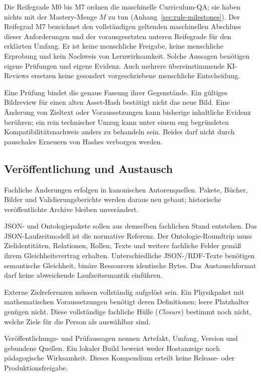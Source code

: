 Die Reifegrade M0 bis M7 ordnen die maschinelle Curriculum-QA; sie haben
nichts mit der Mastery-Menge $M$ zu tun
(Anhang~\ref{sec:rule-milestones}). Der Reifegrad M7 bezeichnet den
vollständigen geltenden maschinellen Abschluss dieser Anforderungen und der
vorausgesetzten unteren Reifegrade für den erklärten Umfang.
Er ist keine menschliche Freigabe, keine menschliche Erprobung
und kein Nachweis von Lernwirksamkeit. Solche Aussagen
benötigen eigene Prüfungen und eigene Evidenz. Auch mehrere
übereinstimmende KI-Reviews ersetzen keine gesondert
vorgeschriebene menschliche Entscheidung.

Eine Prüfung bindet die genaue Fassung ihrer Gegenstände.
Ein gültiges Bildreview für einen alten Asset-Hash bestätigt
nicht das neue Bild. Eine Änderung von Zieltext oder
Voraussetzungen kann bisherige inhaltliche Evidenz berühren;
ein rein technischer Umzug kann unter einem eng begründeten
Kompatibilitätsnachweis anders zu behandeln sein. Beides darf
nicht durch pauschales Erneuern von Hashes verborgen werden.

\subsection{Veröffentlichung und Austausch}

Fachliche Änderungen erfolgen in kanonischen Autorenquellen.
Pakete, Bücher, Bilder und Validierungsberichte werden daraus neu gebaut;
historische veröffentlichte Archive bleiben unverändert.

JSON- und Ontologiepakete sollen aus demselben fachlichen Stand entstehen.
Das JSON-Laufzeitmodell ist die normative Referenz. Der Ontologie-Roundtrip
muss Zielidentitäten, Relationen, Rollen, Texte und weitere fachliche Felder
gemäß ihrem Gleichheitsvertrag erhalten. Unterschiedliche JSON-/RDF-Texte
benötigen semantische Gleichheit, binäre Ressourcen identische Bytes.
Das Austauschformat darf keine abweichende Laufzeitsemantik einführen.

Externe Zielreferenzen müssen vollständig aufgelöst sein. Ein Physikpaket
mit mathematischen Voraussetzungen benötigt deren Definitionen;
leere Platzhalter genügen nicht. Diese vollständige fachliche Hülle
(\emph{Closure}) bestimmt noch nicht, welche Ziele für die Person als
 auswählbar sind.

Veröffentlichungs- und Prüfaussagen nennen Artefakt, Umfang, Version und
gebundene Quellen. Ein lokaler Build beweist weder Hostanzeige noch
pädagogische Wirksamkeit. Dieses Kompendium erteilt keine Release- oder
Produktionsfreigabe.

